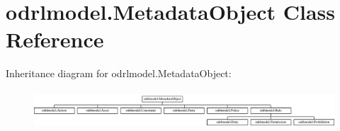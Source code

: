 \hypertarget{classodrlmodel_1_1_metadata_object}{\section{odrlmodel.\-Metadata\-Object Class Reference}
\label{classodrlmodel_1_1_metadata_object}
}
Inheritance diagram for odrlmodel.\-Metadata\-Object\-:\begin{figure}[H]
\begin{center}
\leavevmode
\includegraphics[height=1.428571cm]{classodrlmodel_1_1_metadata_object}
\end{center}
\end{figure}
